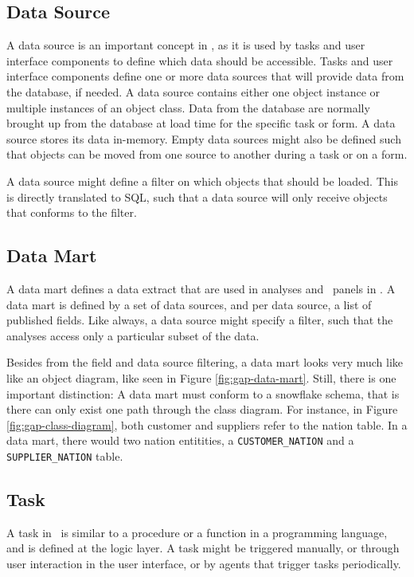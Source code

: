 \subsection{Data Source}
\label{sub:Data Source}
A data source is an important concept in \gap, as it is used by tasks and user interface components to define which data should be accessible. Tasks and user interface components define one or more data sources that will provide data from the database, if needed. A data source contains either one object instance or multiple instances of an object class. Data from the database are normally brought up from the database at load time for the specific task or form. A data source stores its data in-memory. Empty data sources might also be defined such that objects can be moved from one source to another during a task or on a form.

A data source might define a filter on which objects that should be loaded. This is directly translated to SQL, such that a data source will only receive objects that conforms to the filter.

\subsection{Data Mart}
\label{sub:Data Mart}
A data mart defines a data extract that are used in analyses and \bd~panels in \gap. A data mart is defined by a set of data sources, and per data source, a list of published fields. Like always, a data source might specify a filter, such that the analyses access only a particular subset of the data.

Besides from the field and data source filtering, a data mart looks very much like like an object diagram, like seen in Figure \ref{fig:gap-data-mart}. Still, there is one important distinction: A data mart must conform to a snowflake schema, that is there can only exist one path through the class diagram. For instance, in Figure \ref{fig:gap-class-diagram}, both customer and suppliers refer to the nation table. In a data mart, there would two nation entitities, a \texttt{CUSTOMER\_NATION} and a \texttt{SUPPLIER\_NATION} table.

\subsection{Task}
\label{sub:Task}
A task in \gap~is similar to a procedure or a function in a programming language, and is defined at the logic layer. A task might be triggered manually, or through user interaction in the user interface, or by agents that trigger tasks periodically.

